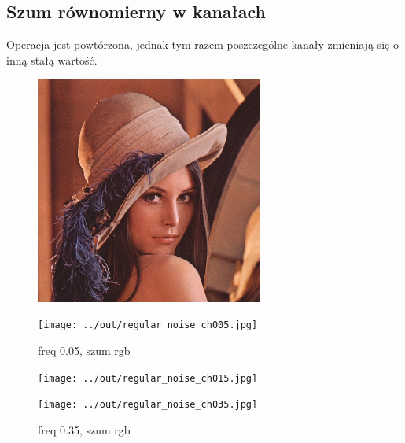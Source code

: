 \documentclass[a4paper,12pt]{article}
\begin{document}
\newpage
\subsection{Szum równomierny w kanałach}
Operacja jest powtórzona, jednak tym razem poszczególne kanały zmieniają się o inną stałą wartość.

\begin{figure}[h!]
\begin{minipage}[t]{7.5cm}
\begin{center}
\includegraphics[width=7.5cm,clip]{../../lena.jpg}
\caption{orginal}
\end{center}
\end{minipage}
\hfill
\begin{minipage}[t]{7.5cm}
\begin{center}
\texttt{[image: ../out/regular\_noise\_ch005.jpg]}
\caption{freq 0.05, szum r\protect g\protect b\protect}
\end{center}
\end{minipage}
\end{figure}

\begin{figure}[h!]
\begin{minipage}[t]{7.5cm}
\begin{center}
\texttt{[image: ../out/regular\_noise\_ch015.jpg]}
\caption{freq 0.15, szum r\protect g\protect b\protect}
\end{center}
\end{minipage}
\hfill
\begin{minipage}[t]{7.5cm}
\begin{center}
\texttt{[image: ../out/regular\_noise\_ch035.jpg]}
\caption{freq 0.35, szum r\protect g\protect b\protect}
\end{center}
\end{minipage}
\end{figure}
\end{document}
